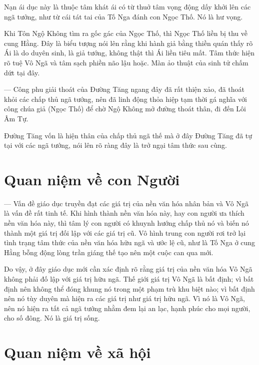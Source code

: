 Nạn ái dục này là thuộc tâm khát ái có từ thuở tâm vọng động dấy khởi lên các ngã tưởng, như từ cái tát tai của Tố Nga đánh con Ngọc Thố. Nó là hư vọng.

Khi Tôn Ngộ Không tìm ra gốc gác của Ngọc Thố, thì Ngọc Thố liền bị thu về cung Hằng. Đây là biểu tượng nói lên rằng khi hành giả bằng thiền quán thấy rõ Ái là do duyên sinh, là giả tướng, không thật thì Ái liền tiêu mất. Tâm thức hiện rõ tuệ Vô Ngã và tâm sạch phiền não lậu hoặc. Màn ảo thuật của sinh tử chấm dứt tại đây.

--- Công phu giải thoát của Đường Tăng ngang đây đã rất thiện xảo, đã thoát khỏi các chấp thủ ngã tướng, nên đã linh động thỏa hiệp tạm thời gá nghĩa với công chúa giả (Ngọc Thố) để chờ Ngộ Không mở đường thoát thân, đi đến Lôi Âm Tự.

Đường Tăng vốn là hiện thân của chấp thủ ngã thế mà ở đây Đường Tăng đã tự tại với các ngã tướng, nói lên rõ ràng đây là trở ngại tâm thức sau cùng.

\section{Quan niệm về con Người} %
\label{sec:91_92_95_con_nguoi}

--- Vấn đề giáo dục truyền đạt các giá trị của nền văn hóa nhân bản và Vô Ngã là vấn đề rất tinh tế. Khi hình thành nền văn hóa này, hay con người ưa thích nền văn hóa này, thì tâm lý con người có khuynh hướng chấp thủ nó và biến nó thành một giá trị đối lập với các giá trị cũ. Vô hình trung con người rơi trở lại tình trạng tâm thức của nền văn hóa hữu ngã và ước lệ cũ, như là Tố Nga ở cung Hằng bỗng động lòng trần giáng thế tạo nên một cuộc can qua mới.

Do vậy, ở đây giáo dục mới cần xác định rõ rằng giá trị của nền văn hóa Vô Ngã không phải đố lập với giá trị hữu ngã. Thế giới giá trị Vô Ngã là bất định; vì bất định nên không thể đóng khung nó trong một phạm trù khu biệt nào; vì bất định nên nó tùy duyên mà hiện ra các giá trị như giá trị hữu ngã. Vì nó là Vô Ngã, nên nó hiện ra tất cả ngã tướng nhằm đem lại an lạc, hạnh phúc cho mọi người, cho số đông. Nó là giá trị sống.

\section{Quan niệm về xã hội} %
\label{sec:91_92_95_xa_hoi}

